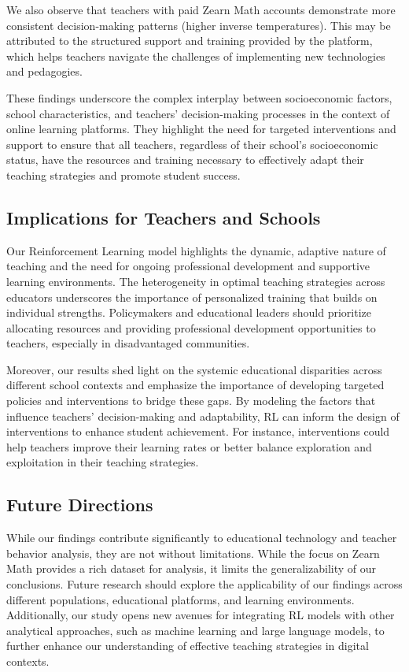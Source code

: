 \documentclass[
  number,
  preprint,
  3p,
  onecolumn]{elsarticle}
\begin{document}
We also observe that teachers with paid Zearn Math accounts demonstrate
more consistent decision-making patterns (higher inverse temperatures).
This may be attributed to the structured support and training provided
by the platform, which helps teachers navigate the challenges of
implementing new technologies and pedagogies.

These findings underscore the complex interplay between socioeconomic
factors, school characteristics, and teachers' decision-making processes
in the context of online learning platforms. They highlight the need for
targeted interventions and support to ensure that all teachers,
regardless of their school's socioeconomic status, have the resources
and training necessary to effectively adapt their teaching strategies
and promote student success.

\subsection{Implications for Teachers and
Schools}\label{implications-for-teachers-and-schools}

Our Reinforcement Learning model highlights the dynamic, adaptive nature
of teaching and the need for ongoing professional development and
supportive learning environments. The heterogeneity in optimal teaching
strategies across educators underscores the importance of personalized
training that builds on individual strengths. Policymakers and
educational leaders should prioritize allocating resources and providing
professional development opportunities to teachers, especially in
disadvantaged communities.

Moreover, our results shed light on the systemic educational disparities
across different school contexts and emphasize the importance of
developing targeted policies and interventions to bridge these gaps. By
modeling the factors that influence teachers' decision-making and
adaptability, RL can inform the design of interventions to enhance
student achievement. For instance, interventions could help teachers
improve their learning rates or better balance exploration and
exploitation in their teaching strategies.

\subsection{Future Directions}\label{future-directions}

While our findings contribute significantly to educational technology
and teacher behavior analysis, they are not without limitations. While
the focus on Zearn Math provides a rich dataset for analysis, it limits
the generalizability of our conclusions. Future research should explore
the applicability of our findings across different populations,
educational platforms, and learning environments. Additionally, our
study opens new avenues for integrating RL models with other analytical
approaches, such as machine learning and large language models, to
further enhance our understanding of effective teaching strategies in
digital contexts.
\end{document}
